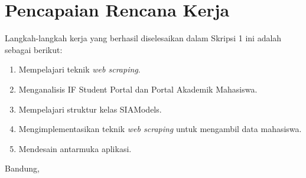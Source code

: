 \documentclass[a4paper,twoside]{article}
\begin{document}
\section{Pencapaian Rencana Kerja}
Langkah-langkah kerja yang berhasil diselesaikan dalam Skripsi 1 ini adalah sebagai berikut:
\begin{enumerate}
\item Mempelajari teknik \textit{web scraping}.
\item Menganalisis IF Student Portal dan Portal Akademik Mahasiswa.
\item Mempelajari struktur kelas SIAModels.
\item Mengimplementasikan teknik \textit{web scraping} untuk mengambil data mahasiswa.
\item Mendesain antarmuka aplikasi.
\end{enumerate}




\vspace{1cm}
\centering Bandung, \tanggal\\
\vspace{2cm} \nama \\ 
\vspace{1cm}
\end{document}
